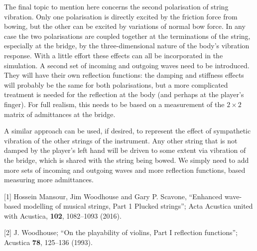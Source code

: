   The final topic to mention here concerns the second polarisation of string 
  vibration. Only one polarisation is directly excited by the friction force 
  from bowing, but the other can be excited by variations of normal bow force. 
  In any case the two polarisations are coupled together at the terminations of 
  the string, especially at the bridge, by the three-dimensional nature of the 
  body’s vibration response. With a little effort these effects can all be 
  incorporated in the simulation. A second set of incoming and outgoing waves 
  need to be introduced. They will have their own reflection functions: the 
  damping and stiffness effects will probably be the same for both 
  polarisations, but a more complicated treatment is needed for the reflection 
  at the body (and perhaps at the player's finger). For full realism, this 
  needs to be based on a measurement of the $2 \times 2$ matrix of admittances 
  at the bridge. 

  A similar approach can be used, if desired, to represent the effect of 
  sympathetic vibration of the other strings of the instrument. Any other 
  string that is not damped by the player's left hand will be driven to some 
  extent via vibration of the bridge, which is shared with the string being 
  bowed. We simply need to add more sets of incoming and outgoing waves and 
  more reflection functions, based measuring more admittances. 

  \sectionreferences{}[1] Hossein Mansour, Jim Woodhouse and Gary P. Scavone, 
  “Enhanced wave-based modelling of musical strings, Part 1 Plucked strings”; 
  Acta Acustica united with Acustica, \textbf{102}, 1082–1093 (2016). 

  [2] J. Woodhouse; “On the playability of violins, Part I reflection 
  functions”; Acustica \textbf{78}, 125–136 (1993). 